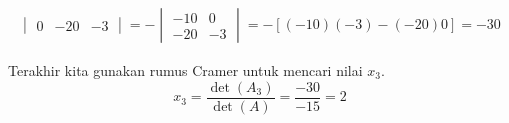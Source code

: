 \documentclass[10pt,openany,a4paper]{article}
\begin{document}
\begin{enumerate}
\begin{itemize}
\begin{align*}
\begin{vmatrix}
                                               0 & -20 & -3
                                           \end{vmatrix}=-\begin{vmatrix}
                                                              -10 & 0  \\
                                                              -20 & -3
                                                          \end{vmatrix}=-[(-10)(-3)-(-20)0]=-30
                    \end{align*}
          \end{itemize}
          Terakhir kita gunakan rumus Cramer untuk mencari nilai $x_3$.
          \[x_3=\frac{\det(A_3)}{\det(A)}=\frac{-30}{-15}=2\]
\end{enumerate}
\end{document}
